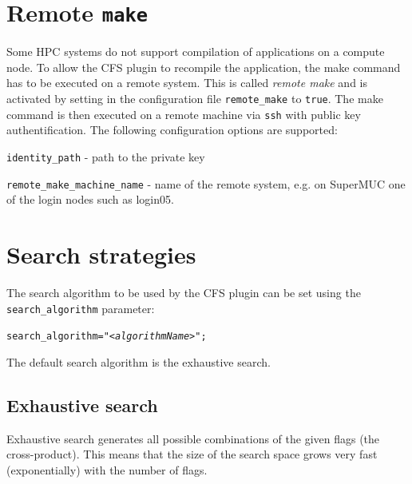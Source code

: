\documentclass[11pt,a4paper, oneside]{book} %
\begin{document}
\section{Remote \texttt{make}}\label{sec:remotemake}

Some HPC systems do not support compilation of applications on a compute node. To allow the CFS plugin to recompile the application, the make command has to be executed on a remote system. This is called {\it remote make} and is activated by setting in the configuration file \texttt{remote\_make} to \texttt{true}. The make command is then executed on a remote machine via \texttt{ssh} with public key authentification. The following configuration options are supported:

\begin{description}
\begin{minipage}{0.8\textwidth}
\item[\texttt{identity\_path}] - path to the private key
\item[\texttt{remote\_make\_machine\_name}] - name of the remote system, e.g. on SuperMUC one of the login nodes such as login05.
\end{minipage}
\end{description}



\section{Search strategies}\label{sec:searchalg}

The search algorithm to be used by the CFS plugin can be set using the \texttt{search\_algorithm} parameter:

    \begin{center}
    \begin{minipage}{0.8\textwidth}
    \texttt{search\_algorithm="\textit{<algorithmName>}";}
    \end{minipage}
    \end{center}

The default search algorithm is the exhaustive search.

\subsection{Exhaustive search}
Exhaustive search generates all possible combinations of the given flags (the cross-product). This means that the size of the search space grows very fast (exponentially) with the number of flags.
\end{document}
